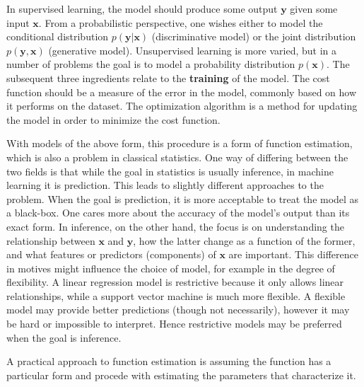 \documentclass[twoside,english]{uiofysmaster}
\begin{document}
In supervised learning, the model should produce some output $\bm{y}$ given some input $\bm{x}$. From a probabilistic perspective, one wishes either to model the conditional distribution $p(\bm{y}| \bm{x})$ (discriminative model) or the joint distribution $p(\bm{y}, \bm{x})$ (generative model). Unsupervised learning is more varied, but in a number of problems the goal is to model a probability distribution $p(\bm{x})$. The subsequent three ingredients relate to the \textbf{training} of the model. The cost function should be a measure of the error in the model, commonly based on how it performs on the dataset. The optimization algorithm is a method for updating the model in order to minimize the cost function.

With models of the above form, this procedure is a form of function estimation, which is also a problem in classical statistics. One way of differing between the two fields is that while the goal in statistics is usually inference, in machine learning it is prediction. This leads to slightly different approaches to the problem. When the goal is prediction, it is more acceptable to treat the model as a black-box. One cares more about the accuracy of the model's output than its exact form. In inference, on the other hand, the focus is on understanding the relationship between $\bm{x}$ and $\bm{y}$, how the latter change as a function of the former, and what features or predictors (components) of $\bm{x}$ are important. This difference in motives might influence the choice of model, for example in the degree of flexibility. A linear regression model is restrictive because it only allows linear relationships, while a support vector machine is much more flexible. A flexible model may provide better predictions (though not necessarily), however it may be hard or impossible to interpret. Hence restrictive models may be preferred when the goal is inference.

A practical approach to function estimation is assuming the function has a particular form and procede with estimating the parameters that characterize it.


\end{document}
